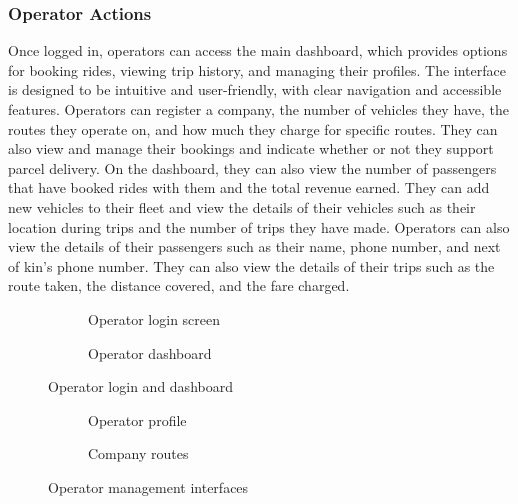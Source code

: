 \subsubsection{Operator Actions}
Once logged in, operators can access the main dashboard, which provides options
for booking rides, viewing trip history, and managing their profiles. The
interface is designed to be intuitive and user-friendly, with clear navigation
and accessible features. Operators can register a company, the number of
vehicles they have, the routes they operate on, and how much they charge for
specific routes. They can also view and manage their bookings and indicate
whether or not they support parcel delivery. On the dashboard, they can also
view the number of passengers that have booked rides with them and the total
revenue earned. They can add new vehicles to their fleet and view the details of
their vehicles such as their location during trips and the number of trips they
have made. Operators can also view the details of their passengers such as their
name, phone number, and next of kin's phone number. They can also view the
details of their trips such as the route taken, the distance covered, and the
fare charged.

\begin{figure}[H]
\centering
\begin{subfigure}[b]{0.35\textwidth}
    \centering
    \caption{Operator login screen}
\end{subfigure}
\hspace{0.1\textwidth}
\begin{subfigure}[b]{0.35\textwidth}
    \centering
    \caption{Operator dashboard}
\end{subfigure}
\caption{Operator login and dashboard}
\label{fig:operator-login-dashboard}
\end{figure}

\begin{figure}[H]
\centering
\begin{subfigure}[b]{0.35\textwidth}
    \centering
    \caption{Operator profile}
\end{subfigure}
\hspace{0.1\textwidth}
\begin{subfigure}[b]{0.35\textwidth}
    \centering
    \caption{Company routes}
\end{subfigure}
\caption{Operator management interfaces}
\label{fig:operator-management}
\end{figure}

